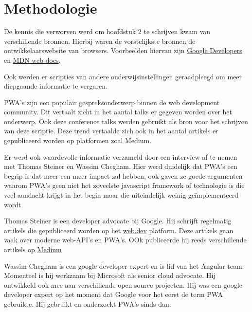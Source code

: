 
\chapter{Methodologie}
\label{ch:methodologie}


De kennis die verworven werd om hoofdstuk 2 te schrijven kwam van verschillende bronnen. 
Hierbij waren de vorstelijkste bronnen de ontwikkelaarswebsite van browsers. Voorbeelden hiervan zijn \href{https://developers.google.com/}{Google Developers} en \href{https://developer.mozilla.org/en-US/}{MDN web docs}.

Ook werden er scripties van andere onderwijsinstellingen geraadpleegd om meer diepgaande informatie te vergaren.

PWA's zijn een populair gespreksonderwerp binnen de web development community. Dit vertaalt zicht in het aantal talks er gegeven worden over het onderwerp. Ook deze conference talks werden gebruikt als bron voor het schrijven van deze scriptie. Deze trend vertaalde zich ook in het aantal artikels er gepubliceerd worden op platformen zoal Medium.

Er werd ook waardevolle informatie verzameld door een interview af te nemen met Thomas Steiner en Wassim Chegham. Hier werd duidelijk dat PWA's een begrip is dat meer een meer impact zal hebben, ook gaven ze goede argumenten waarom PWA's geen niet het zoveelste javascript framework of technologie is die veel aandacht krijgt in het begin maar die uiteindelijk weinig geïmplementeerd wordt.


Thomas Steiner is een developer advocate bij Google. Hij schrijft regelmatig artikels die gepubliceerd worden op het \href{https://web.dev/authors/thomassteiner/}{web.dev} platform. Deze artikels gaan vaak over moderne web-API's en PWA's. OOk publiceerde hij reeds verschillende artikels op \href{https://medium.com/@tomayac}{Medium}

Wassim Chegham is een google developer expert en is lid van het Angular team. Momenteel is hij werkzaam bij Microsoft als senior cloud advocate. Hij ontwikkeld ook mee aan verschillende open source projecten. Hij was een google developer expert op het moment dat Google voor het eerst de term PWA gebruikte. Hij gebruikt en onderzoekt PWA's sinds dan.

